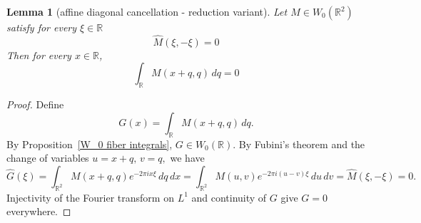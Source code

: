 \documentclass[12pt,reqno]{amsart}
\theoremstyle{plain}
\newtheorem{lemma}[theorem]{Lemma}
\numberwithin{equation}{section}
\theoremstyle{remark}
\newcommand{\using}[1]{}
\begin{document}
\begin{lemma}[affine diagonal cancellation - reduction variant]
\label{lem:affine-diagonal-cancellation-reduction}\using{W_0 fiber integrals}
Let \(M\in W_0(\mathbb R^2)\) satisfy for every \(\xi\in\mathbb R\)
\begin{equation}\label{auto:affine-diagonal-cancellation-assumption}
\widehat M(\xi,-\xi)=0
\end{equation}
 Then for every \(x\in\mathbb R\),
\begin{equation}
    \label{E:affine-diagonal-cancellation}
    \int_{\mathbb R}M(x+q,q)\,dq=0
\end{equation}
\end{lemma}

\begin{proof}
    Define
\[
G(x)=\int_{\mathbb R}M(x+q,q)\,dq.
\]
By Proposition~\ref{W_0 fiber integrals}, \(G\in W_0(\mathbb R)\).
By Fubini's theorem and the change of variables
$ u=x+q, \, v=q, $
we have
\[
\widehat G(\xi)
=
\int_{\mathbb R^2}
M(x+q,q)e^{-2\pi ix\xi}\,dq\,dx
=
\int_{\mathbb R^2}
M(u,v)e^{-2\pi i(u-v)\xi}\,du\,dv=
\widehat M(\xi,-\xi)
=
0.
\]
Injectivity of the Fourier transform on \(L^1\) and continuity of $G$ give
\(G=0\) everywhere.
\end{proof}
\end{document}
